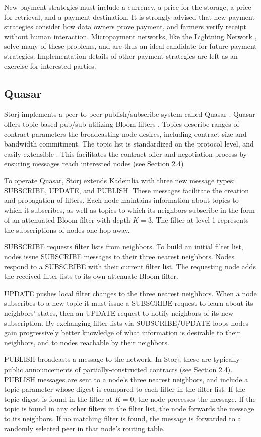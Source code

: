\documentclass[a4paper,10pt]{article}
\begin{document}
New payment strategies must include a currency, a price for the storage, a price for retrieval, and a payment destination. It is strongly advised that new payment strategies consider how data owners prove payment, and farmers verify receipt without human interaction. Micropayment networks, like the Lightning Network \cite{25}, solve many of these problems, and are thus an ideal candidate for future payment strategies. Implementation details of other payment strategies are left as an exercise for interested parties.

\subsection{Quasar}
Storj implements a peer-to-peer publish/subscribe system called Quasar \cite{8}\cite{9}. Quasar offers topic-based pub/sub utilizing Bloom filters \cite{10}. Topics describe ranges of contract parameters the broadcasting node desires, including contract size and bandwidth commitment. The topic list is standardized on the protocol level, and easily extensible \cite{11}. This facilitates the contract offer and negotiation process by ensuring messages reach interested nodes (see Section 2.4)

To operate Quasar, Storj extends Kademlia with three new message types: SUBSCRIBE, UPDATE, and PUBLISH. These messages facilitate the creation and propagation of filters. Each node maintains information about topics to which it subscribes, as well as topics to which its neighbors subscribe in the form of an attenuated Bloom filter with depth $ K = 3 $. The filter at level 1 represents the subscriptions of nodes one hop away.

SUBSCRIBE requests filter lists from neighbors. To build an initial filter list, nodes issue SUBSCRIBE messages to their three nearest neighbors. Nodes respond to a SUBSCRIBE with their current filter list. The requesting node adds the received filter lists to its own attenuate Bloom filter.

UPDATE pushes local filter changes to the three nearest neighbors. When a node subscribes to a new topic it must issue a SUBSCRIBE request to learn about its neighbors’ states, then an UPDATE request to notify neighbors of its new subscription. By exchanging filter lists via SUBSCRIBE/UPDATE loops nodes gain progressively better knowledge of what information is desirable to their neighbors, and to nodes reachable by their neighbors.

PUBLISH broadcasts a message to the network. In Storj, these are typically public announcements of partially-constructed contracts (see Section 2.4). PUBLISH messages are sent to a node’s three nearest neighbors, and include a topic parameter whose digest is compared to each filter in the filter list. If the topic digest is found in the filter at $ K = 0 $, the node processes the message. If the topic is found in any other filters in the filter list, the node forwards the message to its neighbors. If no matching filter is found, the message is forwarded to a randomly selected peer in that node’s routing table.
\end{document}
